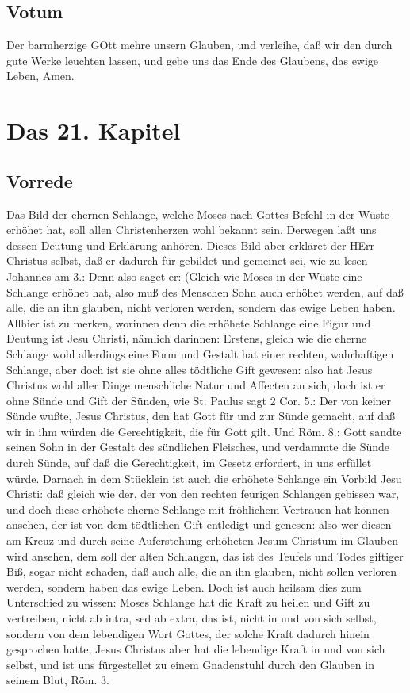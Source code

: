 \section{Votum}

Der barmherzige GOtt mehre unsern Glauben, und verleihe, daß wir den durch gute Werke leuchten lassen, und gebe uns das Ende des Glaubens, das ewige Leben, Amen.

\chapter{Das 21. Kapitel}

\section{Vorrede}

Das Bild der ehernen Schlange, welche Moses nach Gottes Befehl in der Wüste erhöhet hat, soll allen Christenherzen wohl bekannt sein. Derwegen laßt uns dessen Deutung und Erklärung anhören. Dieses Bild aber erkläret der HErr Christus selbst, daß er dadurch für gebildet und gemeinet sei, wie zu lesen Johannes am 3.: Denn also saget er: (Gleich wie Moses in der Wüste eine Schlange erhöhet hat, also muß des Menschen Sohn auch erhöhet werden, auf daß alle, die an ihn glauben, nicht verloren werden, sondern das ewige Leben haben. Allhier ist zu merken, worinnen denn die erhöhete Schlange eine Figur und Deutung ist Jesu Christi, nämlich darinnen: Erstens, gleich wie die eherne Schlange wohl allerdings eine Form und Gestalt hat einer rechten, wahrhaftigen Schlange, aber doch ist sie ohne alles tödtliche Gift gewesen: also hat Jesus Christus wohl aller Dinge menschliche Natur und Affecten an sich, doch ist er ohne Sünde und Gift der Sünden, wie St. Paulus sagt 2 Cor. 5.: Der von keiner Sünde wußte, Jesus Christus, den hat Gott für und zur Sünde gemacht, auf daß wir in ihm würden die Gerechtigkeit, die für Gott gilt. Und Röm. 8.: Gott sandte seinen Sohn in der Gestalt des sündlichen Fleisches, und verdammte die Sünde durch Sünde, auf daß die Gerechtigkeit, im Gesetz erfordert, in uns erfüllet würde. Darnach in dem Stücklein ist auch die erhöhete Schlange ein Vorbild Jesu Christi: daß gleich wie der, der von den rechten feurigen Schlangen gebissen war, und doch diese erhöhete eherne Schlange mit fröhlichem Vertrauen hat können ansehen, der ist von dem tödtlichen Gift entledigt und genesen: also wer diesen am Kreuz und durch seine Auferstehung erhöheten Jesum Christum im Glauben wird ansehen, dem soll der alten Schlangen, das ist des Teufels und Todes giftiger Biß, sogar nicht schaden, daß auch alle, die an ihn glauben, nicht sollen verloren werden, sondern haben das ewige Leben. Doch ist auch heilsam dies zum Unterschied zu wissen: Moses Schlange hat die Kraft zu heilen und Gift zu vertreiben, nicht ab intra, sed ab extra, das ist, nicht in und von sich selbst, sondern von dem lebendigen Wort Gottes, der solche Kraft dadurch hinein gesprochen hatte; Jesus Christus aber hat die lebendige Kraft in und von sich selbst, und ist uns fürgestellet zu einem Gnadenstuhl durch den Glauben in seinem Blut, Röm. 3.


